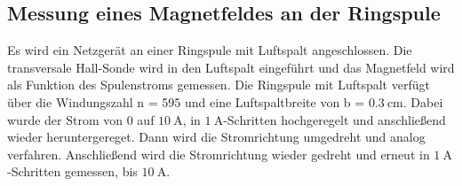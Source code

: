 \subsection{Messung eines Magnetfeldes an der Ringspule}

Es wird ein Netzgerät an einer Ringspule mit Luftspalt angeschlossen.
Die transversale Hall-Sonde wird in den Luftspalt eingeführt und das Magnetfeld wird als Funktion des Spulenstroms gemessen.
Die Ringspule mit Luftspalt verfügt über die Windungszahl n = 595 und eine Luftspaltbreite von b = $\SI{0.3}{\centi\metre}$.
Dabei wurde der Strom von 0 auf $\SI{10}{\ampere}$, in $\SI{1}{\ampere}$-Schritten hochgeregelt und anschließend wieder heruntergereget.
Dann wird die Stromrichtung umgedreht und analog verfahren. Anschließend wird
die Stromrichtung wieder gedreht und erneut in $\SI{1}{\ampere}$-Schritten gemessen, bis $\SI{10}{\ampere}$.
